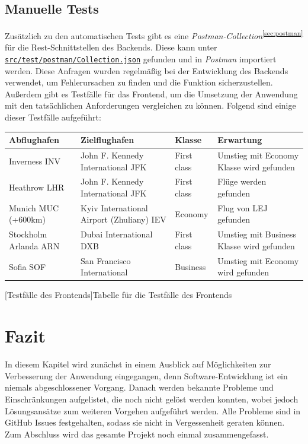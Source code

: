 \documentclass[12pt,twoside,a4paper]{article}
\begin{document}
\begin{sloppypar}
\subsection{Manuelle Tests}
Zusätzlich zu den automatischen Tests gibt es eine \textit{Postman-Collection}\textsuperscript{\ref{sec:postman}} für die Rest-Schnittstellen des Backends. Diese kann unter \href{https://github.com/featherkraken/featherkraken/blob/master/src/test/postman/Collection.json}{\texttt{src/test/postman/Collection.json}} gefunden und in \textit{Postman} importiert werden. Diese Anfragen wurden regelmäßig bei der Entwicklung des Backends verwendet, um Fehlerursachen zu finden und die Funktion sicherzustellen.\\
Außerdem gibt es Testfälle für das Frontend, um die Umsetzung der Anwendung mit den tatsächlichen Anforderungen vergleichen zu können. Folgend sind einige dieser Testfälle aufgeführt:
\vspace{1cm}
\begin{center}
	\captionsetup{type=figure}
	\resizebox{\textwidth}{!}
	{\begin{tabular}{ l | l | l | l }
			\textbf{Abflughafen} & \textbf{Zielflughafen} & \textbf{Klasse} & \textbf{Erwartung} \\
			\hline
			Inverness INV & John F. Kennedy International JFK & First class &  Umstieg mit Economy Klasse wird gefunden\\
			\hline
			Heathrow LHR & John F. Kennedy International JFK & First class &  Flüge werden gefunden\\
			\hline
			Munich MUC (+600km) & Kyiv International Airport (Zhuliany) IEV & Economy &  Flug von LEJ gefunden\\
			\hline
			Stockholm Arlanda ARN & Dubai International DXB & First class &  Umstieg mit Business Klasse wird gefunden\\
			\hline
			Sofia SOF & San Francisco International & Business &  Umstieg mit Economy wird gefunden\\
	\end{tabular}}
	[Testfälle des Frontends]{Tabelle für die Testfälle des Frontends}
	\label{fig:ui-tests}
\end{center}
\newpage
\section{Fazit}
In diesem Kapitel wird zunächst in einem Ausblick auf Möglichkeiten zur Verbesserung der Anwendung eingegangen, denn Software-Entwicklung ist ein niemals abgeschlossener Vorgang. Danach werden bekannte Probleme und Einschränkungen aufgelistet, die noch nicht gelöst werden konnten, wobei jedoch Lösungsansätze zum weiteren Vorgehen aufgeführt werden. Alle Probleme sind in GitHub Issues festgehalten, sodass sie nicht in Vergessenheit geraten können. Zum Abschluss wird das gesamte Projekt noch einmal zusammengefasst.

\end{sloppypar}
\end{document}
